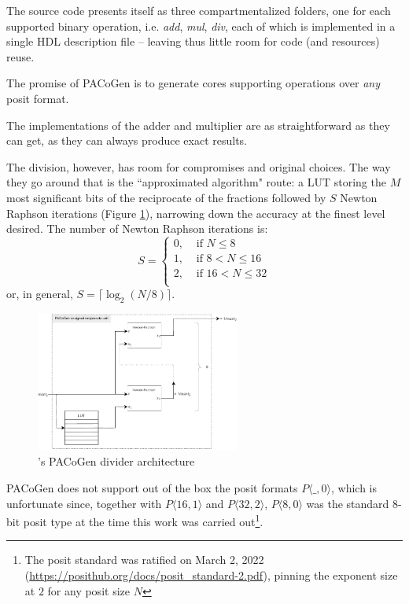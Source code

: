 The source code presents itself as three compartmentalized folders, one for each supported binary operation, i.e. \textit{add}, \textit{mul}, \textit{div}, each of which is implemented in a single HDL description file -- leaving thus little room for code (and resources) reuse.

The promise of PACoGen is to generate cores supporting operations over \textit{any} posit format.

The implementations of the adder and multiplier are as straightforward as they can get, as they can always produce exact results.

 The division, however, has room for compromises and original choices. The way they go around that is the ``approximated algorithm" route: a  LUT storing the $M$ most significant bits of the reciprocate of the fractions followed by $S$ Newton Raphson iterations (Figure \ref{fig:pacoge_divider_architecture}), narrowing down the accuracy at the finest level desired. The number of Newton Raphson iterations is:
    \begin{equation*}\label{equ:regime_k_equation}
        S = \begin{cases}
        0, &\text{ if } N \le 8 \\
        1, &\text{ if } 8 < N \leq 16 \\
        2, &\text{ if } 16 < N \le 32 \\
        \end{cases}
    \end{equation*}
    or, in general, $S = \lceil \log_2(N / 8) \rceil$.

\begin{figure}
    \centering
    \includegraphics[width=0.6\textwidth]{figures/div_pacogen_architecture.pdf}
    \caption{\cite{PACoGen}'s PACoGen divider architecture}
    \label{fig:pacoge_divider_architecture}
\end{figure}


PACoGen does not support out of the box the posit formats $P\langle\_, 0\rangle$, which is unfortunate since, together with $P\langle16, 1\rangle$ and $P\langle32, 2\rangle$, $P\langle8, 0\rangle$ was the standard $8$-bit posit type at the time this work was carried out\footnote{The posit standard was ratified on March 2, 2022 (\url{https://posithub.org/docs/posit_standard-2.pdf}), pinning the exponent size at $2$ for any posit size $N$}.

